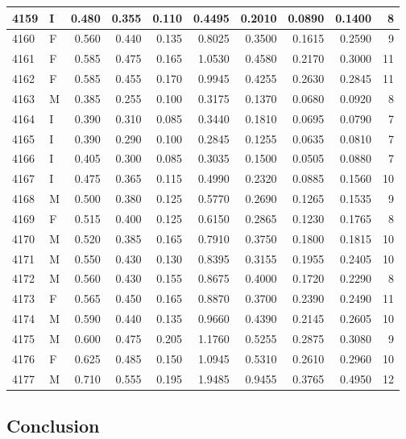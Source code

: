 \documentclass[9pt,twocolumn,twoside,]{pnas-new}
\begin{document}
\begin{tabular}{l|l|r|r|r|r|r|r|r|r}
\hline
4159 & I & 0.480 & 0.355 & 0.110 & 0.4495 & 0.2010 & 0.0890 & 0.1400 & 8\\
\hline
4160 & F & 0.560 & 0.440 & 0.135 & 0.8025 & 0.3500 & 0.1615 & 0.2590 & 9\\
\hline
4161 & F & 0.585 & 0.475 & 0.165 & 1.0530 & 0.4580 & 0.2170 & 0.3000 & 11\\
\hline
4162 & F & 0.585 & 0.455 & 0.170 & 0.9945 & 0.4255 & 0.2630 & 0.2845 & 11\\
\hline
4163 & M & 0.385 & 0.255 & 0.100 & 0.3175 & 0.1370 & 0.0680 & 0.0920 & 8\\
\hline
4164 & I & 0.390 & 0.310 & 0.085 & 0.3440 & 0.1810 & 0.0695 & 0.0790 & 7\\
\hline
4165 & I & 0.390 & 0.290 & 0.100 & 0.2845 & 0.1255 & 0.0635 & 0.0810 & 7\\
\hline
4166 & I & 0.405 & 0.300 & 0.085 & 0.3035 & 0.1500 & 0.0505 & 0.0880 & 7\\
\hline
4167 & I & 0.475 & 0.365 & 0.115 & 0.4990 & 0.2320 & 0.0885 & 0.1560 & 10\\
\hline
4168 & M & 0.500 & 0.380 & 0.125 & 0.5770 & 0.2690 & 0.1265 & 0.1535 & 9\\
\hline
4169 & F & 0.515 & 0.400 & 0.125 & 0.6150 & 0.2865 & 0.1230 & 0.1765 & 8\\
\hline
4170 & M & 0.520 & 0.385 & 0.165 & 0.7910 & 0.3750 & 0.1800 & 0.1815 & 10\\
\hline
4171 & M & 0.550 & 0.430 & 0.130 & 0.8395 & 0.3155 & 0.1955 & 0.2405 & 10\\
\hline
4172 & M & 0.560 & 0.430 & 0.155 & 0.8675 & 0.4000 & 0.1720 & 0.2290 & 8\\
\hline
4173 & F & 0.565 & 0.450 & 0.165 & 0.8870 & 0.3700 & 0.2390 & 0.2490 & 11\\
\hline
4174 & M & 0.590 & 0.440 & 0.135 & 0.9660 & 0.4390 & 0.2145 & 0.2605 & 10\\
\hline
4175 & M & 0.600 & 0.475 & 0.205 & 1.1760 & 0.5255 & 0.2875 & 0.3080 & 9\\
\hline
4176 & F & 0.625 & 0.485 & 0.150 & 1.0945 & 0.5310 & 0.2610 & 0.2960 & 10\\
\hline
4177 & M & 0.710 & 0.555 & 0.195 & 1.9485 & 0.9455 & 0.3765 & 0.4950 & 12\\
\hline
\end{tabular}

\subsection{Conclusion}\label{conclusion}
\end{document}
